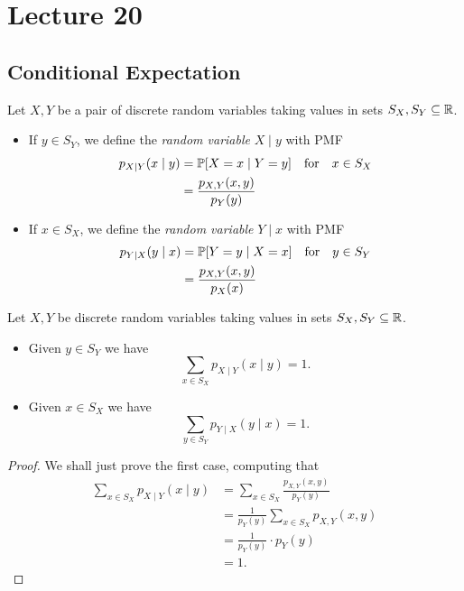 \documentclass[class=article, crop=false]{standalone}
\begin{document}
  \section{Lecture 20}
  \subsection{Conditional Expectation}
  \begin{definition}{}
    Let $X, Y$ be a pair of discrete random variables taking values in sets $S_X, S_Y\sse\R$.
    \begin{itemize}
      \item If $y\in S_Y$, we define the \emph{random variable} $X\mid y$ with PMF
      \begin{align*}
        p_{X\mid Y}(x\mid y) &= \P[X = x\mid Y = y]\quad\text{for}\quad x\in S_X \\
                             &= \frac{p_{X, Y}(x, y)}{p_Y(y)}
      \end{align*}
      \item If $x\in S_X$, we define the \emph{random variable} $Y\mid x$ with PMF
      \begin{align*}
        p_{Y\mid X}(y\mid x) &= \P[Y = y\mid X = x]\quad\text{for}\quad y\in S_Y \\
                             &= \frac{p_{X, Y}(x, y)}{p_X(x)}
      \end{align*}
    \end{itemize}
  \end{definition}
  \begin{theorem}{}
    Let $X, Y$ be discrete random variables taking values in sets $S_X, S_Y\sse\R$.
    \begin{itemize}
      \item Given $y\in S_Y$ we have
      \[
        \sum_{x\in S_X}p_{X\mid Y}(x\mid y) = 1.
      \]
      \item Given $x\in S_X$ we have
      \[
        \sum_{y\in S_Y}p_{Y\mid X}(y\mid x) = 1.
      \]
    \end{itemize}
    \begin{proof}
      We shall just prove the first case, computing that
      \begin{align*}
        \sum_{x\in S_X}p_{X\mid Y}(x\mid y) &= \sum_{x\in S_X} \frac{p_{X, Y}(x, y)}{p_Y(y)} \\
                                            &= \frac{1}{p_Y(y)}\sum_{x\in S_X}p_{X, Y}(x, y) \\
                                            &= \frac{1}{p_Y(y)}\cdot p_Y(y) \\
                                            &= 1.
      \end{align*}
    \end{proof}
  \end{theorem}
\end{document}
